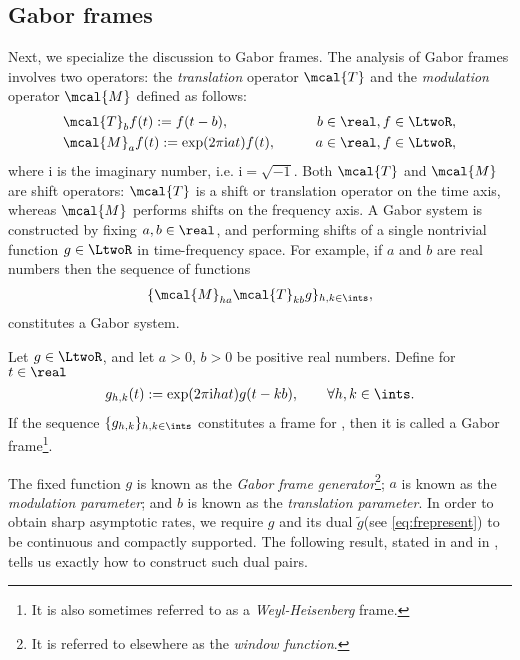 \documentclass[a4paper, 12pt]{article}
\renewcommand{\i}{\mathrm{i}}
\newcommand{\tg}{\ensuremath{\tilde{g}}\xspace}
\begin{document}
\subsection{ Gabor frames}
Next, we specialize the discussion to Gabor frames. The analysis of Gabor frames involves two operators: the \emph{translation} operator  $\mcal{T}$ and  the \emph{modulation} operator $\mcal{M}$ defined as follows: 
\begin{align}
  & \mcal{T}_bf(t) := f(t -  b), &\qquad b \in \real, f \in \LtwoR, \label{eq:translation}\\
  & \mcal{M}_af(t) := \exp({2\pi \i at})f(t), &\qquad a \in \real, f \in \LtwoR,\label{eq:modulation} 
\end{align}
where $\i$ is the imaginary number, i.e.  $\i = \sqrt{-1}$.  Both $\mcal{T}$ and $\mcal{M}$ are shift operators: $\mcal{T}$ is a shift or translation operator on the time axis, whereas $\mcal{M}$ performs shifts on the frequency axis. A Gabor system is constructed by fixing $a, b \in \real$, and  performing shifts of a single nontrivial  function $g \in \LtwoR$  in time-frequency space. For example,  if $a$ and $b$ are real numbers then the sequence of functions  
\begin{align}
  \{\mcal{M}_{ha} \mcal{T}_{kb} g\}_{h,k \in \ints},\notag
  \label{}
\end{align}
constitutes  a Gabor system. 
\begin{defn}
  Let $g \in \LtwoR$, and let  $a > 0$, $b > 0$ be  positive real numbers. Define for $t \in \real$    
\begin{align}
  g_{h,k}(t) := \exp({2 \pi \i h a t })g(t - k b), \qquad  \forall h,k \in \ints. \notag    
 \end{align}
 If the sequence $\{g_{h,k}\}_{h,k \in \ints}$ constitutes a  frame for \LtwoR, then it is called a Gabor frame\footnote{It is also sometimes referred to as a \emph{Weyl-Heisenberg} frame.}. 
\end{defn}
\noindent The fixed function $g$ is known as  the \emph{Gabor frame generator}\footnote{It is  referred to elsewhere as the \emph{window function}.}; $a$ is known as the \emph{modulation parameter}; and $b$ is known as the \emph{translation parameter}.   
In order to obtain sharp asymptotic rates, we require $g$ and its dual \tg (see \eqref{eq:frepresent}) to be continuous and compactly supported. The following result, stated  in  \cite[Lemma 1.2]{Christensen2006} and in  \cite[Proposition 2.4]{Zhang2008}, tells us exactly how to construct such dual pairs.
\end{document}
